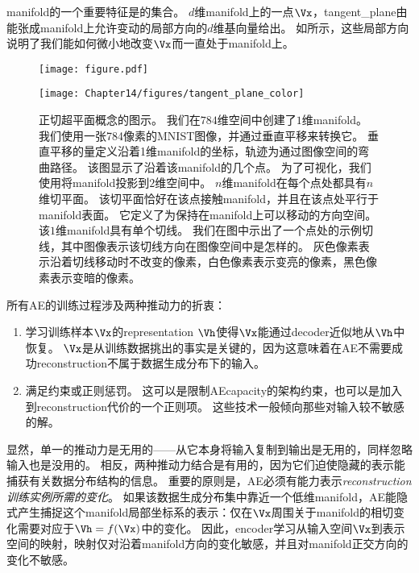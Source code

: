 \gls{manifold}的一个重要特征是的集合。
$d$维\gls{manifold}上的一点$\Vx$，\gls{tangent_plane}由能张成\gls{manifold}上允许变动的局部方向的$d$维基向量给出。
如所示，这些局部方向说明了我们能如何微小地改变$\Vx$而一直处于\gls{manifold}上。

\begin{figure}[!htb]
\ifOpenSource
\centerline{\texttt{[image: figure.pdf]}}
\else
\centerline{\texttt{[image: Chapter14/figures/tangent\_plane\_color]}}
\fi
\caption{正切超平面概念的图示。
我们在$784$维空间中创建了$1$维\gls{manifold}。
我们使用一张784像素的MNIST图像，并通过垂直平移来转换它。
垂直平移的量定义沿着1维\gls{manifold}的坐标，轨迹为通过图像空间的弯曲路径。
该图显示了沿着该\gls{manifold}的几个点。
为了可视化，我们使用将\gls{manifold}投影到$2$维空间中。
$n$维\gls{manifold}在每个点处都具有$n$维切平面。
该切平面恰好在该点接触\gls{manifold}，并且在该点处平行于\gls{manifold}表面。
它定义了为保持在\gls{manifold}上可以移动的方向空间。
该$1$维\gls{manifold}具有单个切线。
我们在图中示出了一个点处的示例切线，其中图像表示该切线方向在图像空间中是怎样的。
灰色像素表示沿着切线移动时不改变的像素，白色像素表示变亮的像素，黑色像素表示变暗的像素。
}
\label{fig:chap14_tangent_plane_color}
\end{figure}


所有\gls{AE}的训练过程涉及两种推动力的折衷：
\begin{enumerate}
 \item 学习训练样本$\Vx$的\gls{representation} $\Vh$使得$\Vx$能通过\gls{decoder}近似地从$\Vh$中恢复。
$\Vx$是从训练数据挑出的事实是关键的，因为这意味着在\gls{AE}不需要成功\gls{reconstruction}不属于数据生成分布下的输入。
 \item 满足约束或正则惩罚。
这可以是限制\gls{AE}\gls{capacity}的架构约束，也可以是加入到\gls{reconstruction}代价的一个正则项。
这些技术一般倾向那些对输入较不敏感的解。
\end{enumerate}


显然，单一的推动力是无用的——从它本身将输入复制到输出是无用的，同样忽略输入也是没用的。
相反，两种推动力结合是有用的，因为它们迫使隐藏的表示能捕获有关数据分布结构的信息。
重要的原则是，\gls{AE}必须有能力表示\emph{\gls{reconstruction}训练实例所需的变化}。
如果该数据生成分布集中靠近一个低维\gls{manifold}，\gls{AE}能隐式产生捕捉这个\gls{manifold}局部坐标系的表示：仅在$\Vx$周围关于\gls{manifold}的相切变化需要对应于$\Vh=f(\Vx)$中的变化。
因此，\gls{encoder}学习从输入空间$\Vx$到表示空间的映射，映射仅对沿着\gls{manifold}方向的变化敏感，并且对\gls{manifold}正交方向的变化不敏感。


